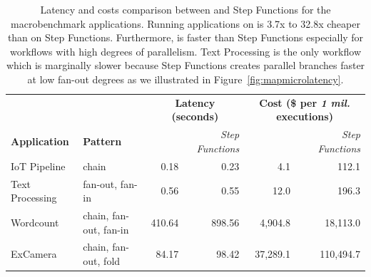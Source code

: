 \begin{table}[t]
  \centering
  \begin{tabular}{ll|rr|rr}
    \hline
    &                        & \multicolumn{2}{c}{\textbf{Latency (seconds)}}            & \multicolumn{2}{c}{\textbf{Cost (\$ per \emph{1 mil.} executions)}}       \\
    \textbf{Application} & \textbf{Pattern}       & \textit{\name{}} & \textit{Step Functions}   & \textit{\name{}} & \textit{Step Functions}            \\ \hline
    IoT Pipeline         & chain                  & 0.18       & 0.23       & 4.1       & 112.1   \\
    Text Processing      & fan-out, fan-in        & 0.56       & 0.55       & 12.0      & 196.3   \\
    Wordcount            & chain, fan-out, fan-in & 410.64     & 898.56     & 4,904.8   & 18,113.0 \\
    ExCamera             & chain, fan-out, fold   & 84.17      & 98.42      & 37,289.1   & 110,494.7      \\ \hline
  \end{tabular}
  \caption{Latency and costs comparison between \name{} and Step Functions for
    the macrobenchmark applications. Running applications on \name{} is 3.7x to
    32.8x cheaper than on Step Functions. Furthermore, \name{} is faster than Step
    Functions especially for workflows with high degrees of parallelism. Text
    Processing is the only workflow which \name{} is marginally slower because
    Step Functions creates parallel branches faster at low fan-out degrees as we
    illustrated in Figure~\ref{fig:mapmicrolatency}.}
  \label{table:macro}
\end{table}

